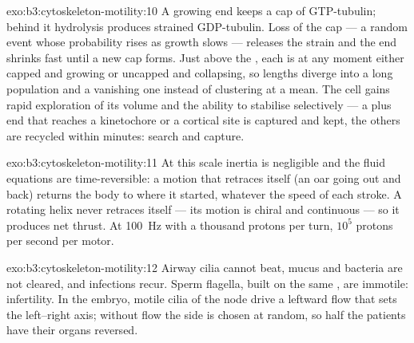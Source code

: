 \begin{solution}{exo:b3:cytoskeleton-motility:10}
A growing end keeps a cap of GTP-tubulin; behind it hydrolysis
produces strained GDP-tubulin. Loss of the cap --- a random event whose
probability rises as growth slows --- releases the strain and the end
shrinks fast until a new cap forms. Just above the , each  is at any moment either capped and
growing or uncapped and collapsing, so lengths diverge into a long
population and a vanishing one instead of clustering at a mean. The
cell gains rapid exploration of its volume and the ability to
stabilise selectively --- a plus end that reaches a kinetochore or a
cortical site is captured and kept, the others are recycled within
minutes: search and capture.
\end{solution}

\begin{solution}{exo:b3:cytoskeleton-motility:11}
At this scale inertia is negligible and the fluid equations are
time-reversible: a motion that retraces itself (an oar going out and
back) returns the body to where it started, whatever the speed of each
stroke. A rotating helix never retraces itself --- its motion is
chiral and continuous --- so it produces net thrust. At \qty{100}{Hz}
with a thousand protons per turn, $10^{5}$ protons per second per
motor.
\end{solution}

\begin{solution}{exo:b3:cytoskeleton-motility:12}
Airway cilia cannot beat, mucus and bacteria are not cleared, and
infections recur. Sperm flagella, built on the same , are
immotile: infertility. In the embryo, motile cilia of the node drive a
leftward flow that sets the left--right axis; without flow the side is
chosen at random, so half the patients have their organs reversed.
\end{solution}

